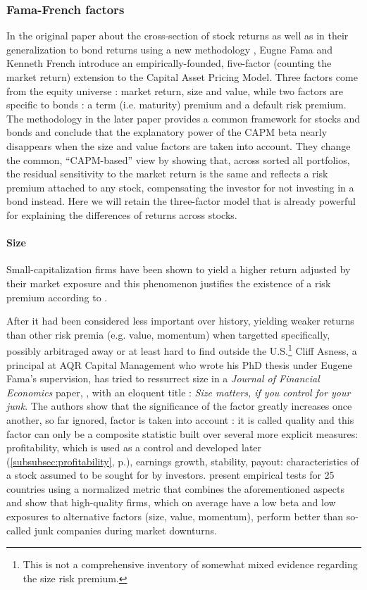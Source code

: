 \subsubsection{Fama-French factors}
In the original paper about the cross-section of stock returns \parencite{Fama1992} as well as in their generalization to bond returns using a new methodology \parencite{Fama1993}, Eugne Fama and Kenneth French introduce an empirically-founded, five-factor (counting the market return) extension to the Capital Asset Pricing Model. Three factors come from the equity universe : market return, size and value, while two factors are specific to bonds : a term (i.e. maturity) premium and a default risk premium. The methodology in the later paper provides a common framework for stocks and bonds and conclude that the explanatory power of the CAPM beta nearly disappears when the size and value factors are taken into account. They change the common, ``CAPM-based'' view by showing that, across sorted all portfolios, the residual sensitivity to the market return is the same and reflects a risk premium attached to any stock, compensating the investor for not investing in a bond instead. Here we will retain the three-factor model that is already powerful for explaining the differences of returns across stocks.
\paragraph{Size}
Small-capitalization firms have been shown to yield a higher return adjusted by their market exposure and this phenomenon justifies the existence of a risk premium according to \cite{Fama1992}.

After it had been considered less important over history, yielding weaker returns than other risk premia (e.g. value, momentum) when targetted specifically, possibly arbitraged away or at least hard to find outside the U.S.\footnote{This is not a comprehensive inventory of somewhat mixed evidence regarding the size risk premium.} Cliff Asness, a principal at AQR Capital Management who wrote his PhD thesis under Eugene Fama's supervision, has tried to ressurrect size in a \emph{Journal of Financial Economics} paper, \cite{Asness2018}, with an eloquent title : \emph{Size matters, if you control for your junk}. The authors show that the significance of the factor greatly increases once another, so far ignored, factor is taken into account : it is called quality and this factor can only be a composite statistic built over several more explicit measures: profitability, which is used as a control and developed later (\autoref{subsubsec:profitability}, p.\pageref{subsubsec:profitability}), earnings growth, stability, payout: characteristics of a stock assumed to be sought for by investors. \cite{Asness2019} present empirical tests for 25 countries using a normalized metric that combines the aforementioned aspects and show that high-quality firms, which on average have a low beta and low exposures to alternative factors (size, value, momentum), perform better than so-called junk companies during market downturns.
